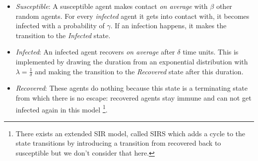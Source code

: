 \begin{itemize}
	\item \textit{Susceptible}: A susceptible agent makes contact \textit{on average} with $\beta$ other random agents. For every \textit{infected} agent it gets into contact with, it becomes infected with a probability of $\gamma$. If an infection happens, it makes the transition to the \textit{Infected} state.

	\item \textit{Infected}: An infected agent recovers \textit{on average} after $\delta$ time units. This is implemented by drawing the duration from an exponential distribution \cite{borshchev_system_2004} with $\lambda = \frac{1}{\delta}$ and making the transition to the \textit{Recovered} state after this duration.

	\item \textit{Recovered}: These agents do nothing because this state is a terminating state from which there is no escape: recovered agents stay immune and can not get infected again in this model \footnote{There exists an extended SIR model, called SIRS which adds a cycle to the state transitions by introducing a transition from recovered back to susceptible but we don't consider that here.}.
\end{itemize}